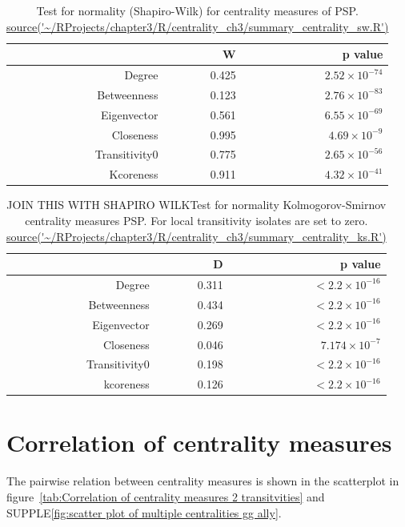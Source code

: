 \begin{table}[ht]
\centering
\begin{tabular}{rrr}
  \toprule
 & W & p value \\ 
  \midrule
Degree & 0.425 & $2.52 \times 10^{-74}$ \\ 
 Betweenness & 0.123 & $2.76 \times 10^{-83}$ \\ 
 Eigenvector & 0.561 & $6.55 \times 10^{-69}$ \\ 
 Closeness & 0.995 & $4.69 \times 10^{-9}$ \\ 
 Transitivity0 & 0.775 & $2.65 \times 10^{-56}$ \\ 
 Kcoreness & 0.911 & $4.32 \times 10^{-41}$ \\ 
   \bottomrule
\end{tabular}
\caption[Shapiro-Wilk tests for centrality measures in the PSP]{Test for normality (Shapiro-Wilk) for centrality measures of PSP.
\url{source('~/RProjects/chapter3/R/centrality_ch3/summary_centrality_sw.R')}}
\label{tab:Test for normality (Shapiro-Wilk) for centrality measures of PSP}
\end{table}

\begin{table}[ht]
\centering
\begin{tabular}{rrr}
  \toprule
 & D & p value \\ 
  \midrule
Degree & 0.311 & $<2.2 \times 10^{-16}$ \\ 
  Betweenness & 0.434 & $<2.2 \times 10^{-16}$ \\ 
  Eigenvector & 0.269 & $<2.2 \times 10^{-16}$ \\ 
  Closeness & 0.046 & $7.174 \times 10^{-7}$ \\ 
  Transitivity0 & 0.198 & $<2.2 \times 10^{-16}$ \\ 
  kcoreness & 0.126 & $<2.2 \times 10^{-16}$ \\ 
   \bottomrule
\end{tabular}
\caption[Kolmogorov-Smirnov tests - centrality measures in the PSP]{JOIN THIS WITH SHAPIRO WILKTest for normality Kolmogorov-Smirnov centrality measures PSP. For local transitivity isolates are set to zero. \url{source('~/RProjects/chapter3/R/centrality_ch3/summary_centrality_ks.R')}}
\label{tab:Test for normality (KS) for centrality measures of PSP}
\end{table}
\section{Correlation of centrality measures}
\label{sec:correlation of centrality measures results section}
The pairwise relation between centrality measures is shown in the scatterplot in figure~\ref{tab:Correlation of centrality measures 2 transitvities} and SUPPLE\ref{fig:scatter plot of multiple centralities gg ally}. 






